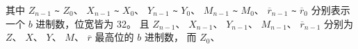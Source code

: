 \documentclass[main\_\_CN.tex]{subfiles}
\begin{document}
其中
\begin{math}Z_{n-1}\end{math} \verb+~+ \begin{math}Z_{0}\end{math}、
\begin{math}X_{n-1}\end{math} \verb+~+ \begin{math}X_{0}\end{math}、
\begin{math}Y_{n-1}\end{math} \verb+~+ \begin{math}Y_{0}\end{math}、
\begin{math}M_{n-1}\end{math} \verb+~+ \begin{math}M_{0}\end{math}、
\begin{math}\overline{r}_{n-1}\end{math} \verb+~+ \begin{math}\overline{r}_{0}\end{math}
分别表示一个 \begin{math}b\end{math} 进制数，位宽皆为 32。
且
\begin{math}Z_{n-1}\end{math}、
\begin{math}X_{n-1}\end{math}、
\begin{math}Y_{n-1}\end{math}、
\begin{math}M_{n-1}\end{math}、
\begin{math}\overline{r}_{n-1}\end{math}
分别为
\begin{math}Z\end{math}、
\begin{math}X\end{math}、
\begin{math}Y\end{math}、
\begin{math}M\end{math}、
\begin{math}\overline{r}\end{math}
最高位的 \begin{math}b\end{math} 进制数，
而
\begin{math}Z_{0}\end{math}、
\end{document}
